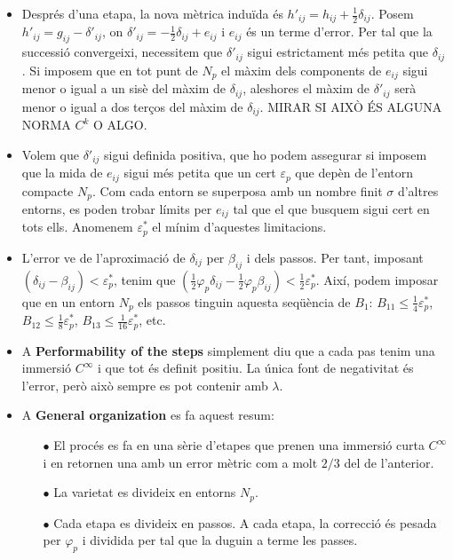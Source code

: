 {\begin{itemize}
\begin{itemize}
        \item[$\bullet$] $B_3$ és la cota de $\overline{z}^\alpha - z^\alpha$.
    \end{itemize}
    \item Després d'una etapa, la nova mètrica induïda és $h'_{ij} = h_{ij} + \frac12\delta_{ij}$. Posem $h'_{ij} = g_{ij} - \delta'_{ij}$, on $\delta'_{ij} =-\frac12\delta_{ij} +e_{ij}$ i $e_{ij}$ és un terme d'error. Per tal que la successió convergeixi, necessitem que $\delta'_{ij}$ sigui estrictament més petita que $\delta_{ij}$. Si imposem que en tot punt de $N_p$ el màxim dels components de $e_{ij}$ sigui menor o igual a un sisè del màxim de $\delta_{ij}$, aleshores el màxim de $\delta'_{ij}$ serà menor o igual a dos terços del màxim de $\delta_{ij}$. MIRAR SI AIXÒ ÉS ALGUNA NORMA $C^k$ O ALGO.
    \item Volem que $\delta'_{ij}$ sigui definida positiva, que ho podem assegurar si imposem que la mida de $e_{ij}$ sigui més petita que un cert $\varepsilon_p$ que depèn de l'entorn compacte $N_p$. Com cada entorn se superposa amb un nombre finit $\sigma$ d'altres entorns, es poden trobar límits per $e_{ij}$ tal que el que busquem sigui cert en tots ells. Anomenem $\varepsilon_p^*$ el mínim d'aquestes limitacions.  
    \item L'error ve de l'aproximació de $\delta_{ij}$ per $\beta_{ij}$ i dels passos. Per tant, imposant $(\delta_{ij}- \beta_{ij}) < \varepsilon_p^*$, tenim que $(\frac12\varphi_p\delta_{ij}- \frac12\varphi_p\beta_{ij}) < \frac12\varepsilon_p^*$. Així, podem imposar que en un entorn $N_p$ els passos tinguin aquesta seqüència de $B_{1}$: $B_{11}\le\frac14\varepsilon_p^*$, $B_{12}\le\frac18\varepsilon_p^*$, $B_{13}\le\frac1{16}\varepsilon_p^*$, etc.
    \item A \textbf{Performability of the steps} simplement diu que a cada pas tenim una immersió $C^\infty$ i que tot és definit positiu. La única font de negativitat és l'error, però això sempre es pot contenir amb $\lambda$.
    \item A \textbf{General organization} es fa aquest resum:
        \begin{itemize}
            \item[$\bullet$] El procés es fa en una sèrie d'etapes que prenen una immersió curta $C^\infty$ i en retornen una amb un error mètric com a molt $2/3$ del de l'anterior.
            \item[$\bullet$] La varietat es divideix en entorns $N_p$. 
            \item[$\bullet$] Cada etapa es divideix en passos. A cada etapa, la correcció és pesada per $\varphi_p$ i dividida per tal que la duguin a terme les passes. 

\end{itemize}
\end{itemize}}
